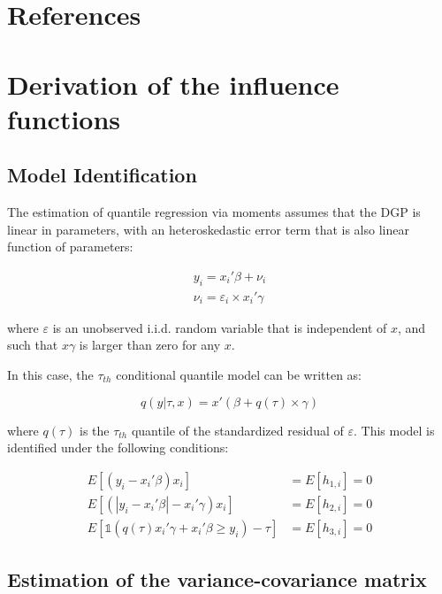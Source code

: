 \documentclass[
  authoryear,
  review,
  1p]{elsarticle}
\begin{document}
\section*{References}\label{references}

\renewcommand{\bibsection}{}


\newpage{}

\appendix

\section{Derivation of the influence
functions}\label{derivation-of-the-influence-functions}

\subsection{Model Identification}\label{model-identification}

The estimation of quantile regression via moments assumes that the DGP
is linear in parameters, with an heteroskedastic error term that is also
linear function of parameters:

\[\begin{aligned}
y_i = x_i'\beta + \nu_i \\
\nu_i = \varepsilon_i \times x_i'\gamma
\end{aligned}
\]

where \(\varepsilon\) is an unobserved i.i.d. random variable that is
independent of \(x\), and such that \(x\gamma\) is larger than zero for
any \(x\).

In this case, the \(\tau_{th}\) conditional quantile model can be
written as:

\[q(y|\tau,x) = x'(\beta + q(\tau) \times \gamma)\]

where \(q(\tau)\) is the \(\tau_{th}\) quantile of the standardized
residual of \(\varepsilon\). This model is identified under the
following conditions:

\[\begin{aligned}
  E[(y_i-x_i'\beta)x_i ]  &= E[h_{1,i}]=0 \\
  E[ (|y_i-x_i'\beta|-x_i' \gamma) x_i ] &=E[h_{2,i}]=0 \\
  E\left[  \mathbb{1}\left( q(\tau) x_i'\gamma +x_i'\beta\geq  y_i  \right) - \tau \right] 
   &=E[h_{3,i}]=0 
\end{aligned}
\]

\subsection{Estimation of the variance-covariance
matrix}\label{estimation-of-the-variance-covariance-matrix}
\end{document}
